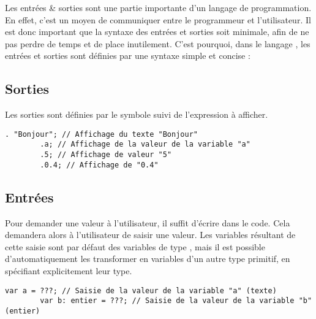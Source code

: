 \documentclass[../userguide.tex]{subfiles}
\begin{document}
    Les entrées \& sorties sont une partie importante d'un langage de programmation.
    En effet, c'est un moyen de communiquer entre le programmeur et l'utilisateur.
    Il est donc important que la syntaxe des entrées et sorties soit minimale, afin de ne pas perdre de temps et de
    place inutilement.
    C'est pourquoi, dans le langage \lang, les entrées et sorties sont définies par une syntaxe simple et concise :

    \subsection{Sorties} \label{subsec:sorties}
    \parindent
    Les sorties sont définies par le symbole  suivi de l'expression à afficher.

    \begin{lstlisting}[label={lst:sorties-ex-1}]
        . "Bonjour"; // Affichage du texte "Bonjour"
        .a; // Affichage de la valeur de la variable "a"
        .5; // Affichage de valeur "5"
        .0.4; // Affichage de "0.4"
    \end{lstlisting}

    \subsection{Entrées} \label{subsec:entrees}
    \parindent
    Pour demander une valeur à l'utilisateur, il suffit d'écrire  dans le code.
    Cela demandera alors à l'utilisateur de saisir une valeur.
    Les variables résultant de cette saisie sont par défaut des variables de type , mais il est possible
    d'automatiquement les transformer en variables d'un autre type primitif, en spécifiant explicitement leur type.

    \begin{lstlisting}[label={lst:entrees-ex-1}]
        var a = ???; // Saisie de la valeur de la variable "a" (texte)
        var b: entier = ???; // Saisie de la valeur de la variable "b" (entier)
    \end{lstlisting}
\end{document}
